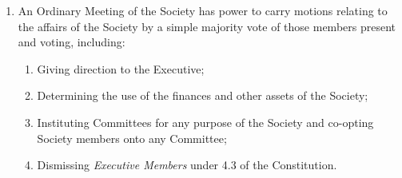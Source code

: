 \documentclass[11pt]{article}
\begin{document}
\begin{enumerate}[\thesection .1]
    \item An Ordinary Meeting of the Society has power to carry motions relating to the affairs of the Society by a simple majority vote of those members present and voting, including:
    \begin{enumerate}
        \item Giving direction to the Executive;
        \item Determining the use of the finances and other assets of the Society;
        \item Instituting Committees for any purpose of the Society and co-opting Society members onto any Committee;
        \item Dismissing \textit{Executive Members} under 4.3 of the Constitution.
    \end{enumerate}
\end{enumerate}
\end{document}
